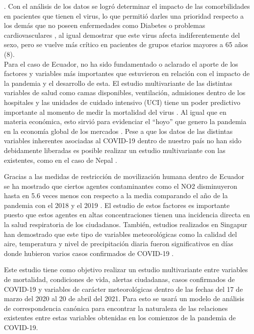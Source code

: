 \citep{Chen2020} . Con el análisis de los datos se logró determinar el
impacto de las comorbilidades en pacientes que tienen el virus, lo que
permitió darles una prioridad respecto a los demás que no poseen
enfermedades como Diabetes o problemas cardiovasculares \citep{Li2020}
\citep{Pal2020} \citep{Zhang2020}, al igual demostrar que este virus
afecta indiferentemente del sexo, pero se vuelve más crítico en
pacientes de grupos etarios mayores a 65 años (8).\\
Para el caso de Ecuador, no ha sido fundamentado o aclarado el aporte de
los factores y variables más importantes que estuvieron en relación con
el impacto de la pandemia y el desarrollo de esta. El estudio
multivariante de las distintas variables de salud como camas
disponibles, ventilación, admisiones dentro de los hospitales y las
unidades de cuidado intensivo (UCI) tiene un poder predictivo importante
al momento de medir la mortalidad del virus \citep{Fatima2020}. Al igual
que en materia económica, esto sirvió para evidenciar el ``hoyo'' que
genero la pandemia en la economía global de los mercados
\citep{Sharma2020}. Pese a que los datos de las distintas variables
inherentes asociadas al COVID-19 dentro de nuestro país no han sido
debidamente liberadas es posible realizar un estudio multivariante con
las existentes, como en el caso de Nepal \citep{Devkota2021}.

Gracias a las medidas de restricción de movilización humana dentro de
Ecuador se ha mostrado que ciertos agentes contaminantes como el NO2
disminuyeron hasta en 5.6 veces menos con respecto a la media comparando
el año de la pandemia con el 2018 y el 2019 \citep{Zambrano2020}. El
estudio de estos factores es importante puesto que estos agentes en
altas concentraciones tienen una incidencia directa en la salud
respiratoria de los ciudadanos. También, estudios realizados en Singapur
han demostrado que este tipo de variables meteorológicas como la calidad
del aire, temperatura y nivel de precipitación diaria fueron
significativos en días donde hubieron varios casos confirmados de
COVID-19 \citep{LORENZO2021111024}.

Este estudio tiene como objetivo realizar un estudio multivariante entre
variables de mortalidad, condiciones de vida, alertas ciudadanas, casos
confirmados de COVID-19 y variables de carácter meteorológicas dentro de
las fechas del 17 de marzo del 2020 al 20 de abril del 2021. Para esto
se usará un modelo de análisis de correspondencia canónica para
encontrar la naturaleza de las relaciones existentes entre estas
variables obtenidas en los comienzos de la pandemia de COVID-19.

